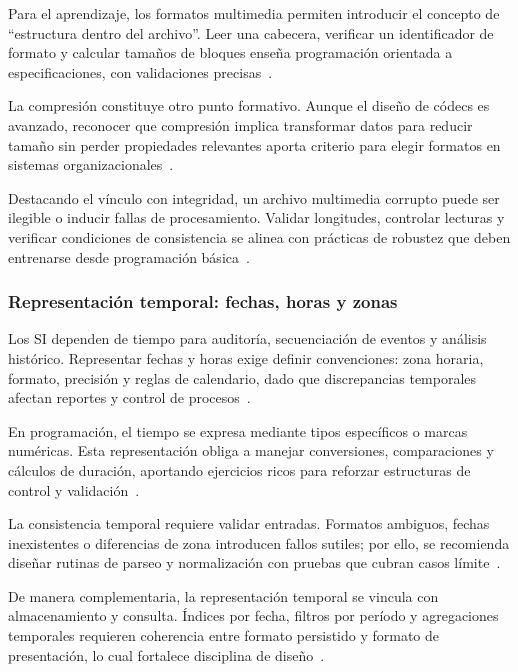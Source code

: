 \documentclass[12pt,twoside]{book}
\begin{document}
						Para el aprendizaje, los formatos multimedia permiten introducir el concepto de “estructura dentro del archivo”. Leer una cabecera, verificar un identificador de formato y calcular tamaños de bloques enseña programación orientada a especificaciones, con validaciones precisas~\cite{Hanly2015Problem,Gaddis2022Starting,ISO247722024Programming}.
						
						La compresión constituye otro punto formativo. Aunque el diseño de códecs es avanzado, reconocer que compresión implica transformar datos para reducir tamaño sin perder propiedades relevantes aporta criterio para elegir formatos en sistemas organizacionales~\cite{Tanenbaum2021Structured,Laudon2020Management,Sommerville2015Software}.
						
						Destacando el vínculo con integridad, un archivo multimedia corrupto puede ser ilegible o inducir fallas de procesamiento. Validar longitudes, controlar lecturas y verificar condiciones de consistencia se alinea con prácticas de robustez que deben entrenarse desde programación básica~\cite{ISO247722024Programming,Ghezzi2003Fundamentals,Pressman2019Software}.
						
					\subsubsection{Representación temporal: fechas, horas y zonas}
						\noindent
						Los SI dependen de tiempo para auditoría, secuenciación de eventos y análisis histórico. Representar fechas y horas exige definir convenciones: zona horaria, formato, precisión y reglas de calendario, dado que discrepancias temporales afectan reportes y control de procesos~\cite{Laudon2020Management,Kendall2014Systems,Date2019Database}.
						
						En programación, el tiempo se expresa mediante tipos específicos o marcas numéricas. Esta representación obliga a manejar conversiones, comparaciones y cálculos de duración, aportando ejercicios ricos para reforzar estructuras de control y validación~\cite{Gaddis2022Starting,Hanly2015Problem,Wirth1976Algorithms}.
						
						La consistencia temporal requiere validar entradas. Formatos ambiguos, fechas inexistentes o diferencias de zona introducen fallos sutiles; por ello, se recomienda diseñar rutinas de parseo y normalización con pruebas que cubran casos límite~\cite{ISO247722024Programming,Pressman2019Software,Hanly2015Problem}.
						
						De manera complementaria, la representación temporal se vincula con almacenamiento y consulta. Índices por fecha, filtros por período y agregaciones temporales requieren coherencia entre formato persistido y formato de presentación, lo cual fortalece disciplina de diseño~\cite{Elmasri2016Database,Silberschatz2020Database,Laudon2020Management}.
						
\end{document}
